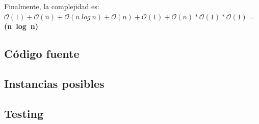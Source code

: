 Finalmente, la complejidad es: $\mathcal{O}(1)+\mathcal{O}(n)+\mathcal{O}(n\ log\ n)+\mathcal{O}(n)+\mathcal{O}(1)+\mathcal{O}(n)*\mathcal{O}(1)*\mathcal{O}(1)$ = \textbf{(n\ log\ n)}

\subsection{Código fuente}



\subsection{Instancias posibles}



\subsection{Testing}
